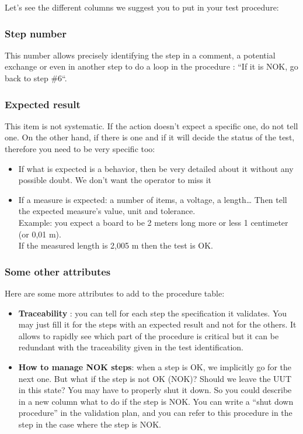 Let’s see the different columns we suggest you to put in your test procedure:

\subsubsection{Step number}
This number allows precisely identifying the step in a comment, a potential exchange or even in another step to do a loop in the procedure : “If it is NOK, go back to step \#6“.

\subsubsection{Expected result}
This item is not systematic. If the action doesn’t expect a specific one, do not tell one. On the other hand, if there is one and if it will decide the status of the test, therefore you need to be very specific too:

\begin{itemize}
    \item If what is expected is a behavior, then be very detailed about it without any possible doubt. We don’t want the operator to miss it
    \item If a measure is expected: a number of items, a voltage, a length… Then tell the expected measure’s value, unit and tolerance.\\Example: you expect a board to be 2 meters long more or less 1 centimeter (or 0,01 m).\\If the measured length is 2,005 m then the test is OK.
\end{itemize}

\subsubsection{Some other attributes}
Here are some more attributes to add to the procedure table:

\begin{itemize}
    \item \textbf{Traceability} : you can tell for each step the specification it validates. You may just fill it for the steps with an expected result and not for the others. It allows to rapidly see which part of the procedure is critical but it can be redundant with the traceability given in the test identification.
    \item \textbf{How to manage NOK steps}: when a step is OK, we implicitly go for the next one. But what if the step is not OK (NOK)? Should we leave the UUT in this state? You may have to properly shut it down. So you could describe in a new column what to do if the step is NOK. You can write a “shut down procedure” in the validation plan, and you can refer to this procedure in the step in the case where the step is NOK.
\end{itemize}


